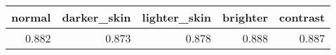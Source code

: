 \begin{tabular}{rrrrr}
\toprule
 normal &  darker\_skin &  lighter\_skin &  brighter &  contrast \\
\midrule
  0.882 &        0.873 &         0.878 &     0.888 &     0.887 \\
\bottomrule
\end{tabular}
